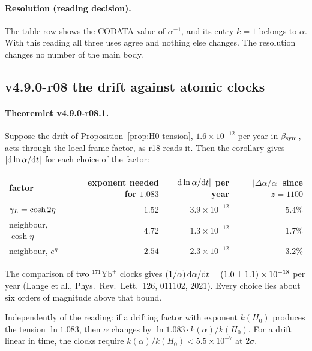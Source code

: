 \paragraph{Resolution (reading decision).}
The table row shows the CODATA value of \(\alpha^{-1}\), and its entry \(k=1\) belongs to \(\alpha\).  With this reading all
three uses agree and nothing else changes.  The resolution changes no number of the main body.

\subsection*{v4.9.0-r08 the drift against atomic clocks}
\label{subsec:v490-r08-clocks}

\paragraph{Theoremlet v4.9.0-r08.1.}
Suppose the drift of Proposition~\ref{prop:H0-tension}, \(1.6\times10^{-12}\) per year in \(\beta_{\mathrm{sym}}\), acts through the local
frame factor, as r18 reads it.  Then the corollary gives \(|{\rm d}\ln\alpha/{\rm d}t|\) for each choice of the factor:

\begin{center}
\small
\begin{tabular}{@{}lrrr@{}}
\toprule
factor & exponent needed for \(1.083\) & \(|{\rm d}\ln\alpha/{\rm d}t|\) per year & \(|\Delta\alpha/\alpha|\) since \(z=1100\)\\
\midrule
\(\gamma_L=\cosh2\eta\) & \(1.52\) & \(3.9\times10^{-12}\) & \(5.4\%\)\\
neighbour, \(\cosh\eta\) & \(4.72\) & \(1.3\times10^{-12}\) & \(1.7\%\)\\
neighbour, \(e^{\eta}\) & \(2.54\) & \(2.3\times10^{-12}\) & \(3.2\%\)\\
\bottomrule
\end{tabular}
\end{center}

The comparison of two \({}^{171}\mathrm{Yb}^+\) clocks gives \((1/\alpha)\,{\rm d}\alpha/{\rm d}t=(1.0\pm1.1)\times10^{-18}\)
per year (Lange et al., Phys.\ Rev.\ Lett.\ 126, 011102, 2021).  Every choice lies about six orders of magnitude above
that bound.

Independently of the reading: if a drifting factor with exponent \(k(H_0)\) produces the tension \(\ln1.083\), then
\(\alpha\) changes by \(\ln1.083\cdot k(\alpha)/k(H_0)\).  For a drift linear in time, the clocks require
\(k(\alpha)/k(H_0)<5.5\times10^{-7}\) at \(2\sigma\).

